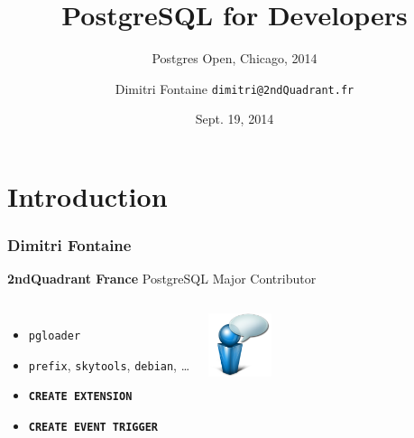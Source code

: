 \documentclass{beamer}
\title{PostgreSQL for Developers}
\subtitle{Postgres Open, Chicago, 2014}
\author{Dimitri Fontaine \texttt{dimitri@2ndQuadrant.fr}}
\date{Sept. 19, 2014}
\begin{document}
\frame{\titlepage}

\section{Introduction}

\begin{frame}[fragile]
  \frametitle{Dimitri Fontaine}

  \begin{center}
    \textbf{2ndQuadrant France}
    \linebreak
    PostgreSQL Major Contributor
  \end{center}
  \vfill

\begin{columns}[c]

  \begin{itemize}
   \item \texttt{pgloader}
   \item \texttt{prefix}, \texttt{skytools}, \texttt{debian}, …
   \item \texttt{\textbf{CREATE EXTENSION}}
   \item \texttt{\textbf{CREATE EVENT TRIGGER}}
  \end{itemize}  

\begin{center}
  \includegraphics[height=5em]{bulle-blue-icon.png}
\end{center}
\end{columns}
\end{frame}
\end{document}
